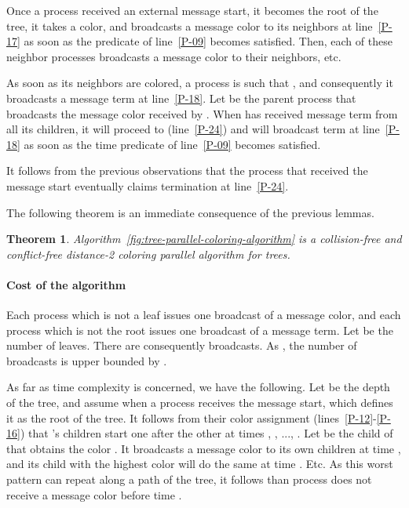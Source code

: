 \documentclass[11pt,english]{article}
\newtheorem{theorem}{Theorem}
\newcommand{\toto}{xxx}
\newenvironment{proofL}{\noindent{\bf
Proof }} {\hspace*{\fill}\par\vspace{3mm}}
\begin{document}
\begin{proofL}
Once a process received an external message {\sc start}, 
it becomes the root of the tree, it takes a color, 
and broadcasts a message {\sc color}
to its neighbors at line~\ref{P-17} as soon as the
predicate of line~\ref{P-09}  becomes satisfied. 
Then, each of these neighbor processes  broadcasts a 
message {\sc color} to their neighbors, etc. 

As soon as its neighbors are  colored, a process  is such 
that , and consequently it broadcasts a message 
{\sc term}  at line~\ref{P-18}. 
Let   be the parent process that  broadcasts the message {\sc color} 
received by . When  has received message {\sc term} 
from all its children, it will proceed to  (line~\ref{P-24}) 
and will broadcast {\sc term}  at line~\ref{P-18} as soon as the 
time predicate of line~\ref{P-09} becomes satisfied. 

It follows from the previous observations that the process that received 
the message {\sc start} eventually claims termination at line~\ref{P-24}. 
\renewcommand{\toto}{lemma:par-termination}
\end{proofL}


\noindent
The following theorem is an immediate consequence of the previous lemmas. 
\begin{theorem}
\label{theo:parallel-coloring}
Algorithm~{\em\ref{fig:tree-parallel-coloring-algorithm}}
is a collision-free and conflict-free distance-2 coloring 
parallel algorithm for trees. 
\end{theorem}

\paragraph{Cost of the algorithm}
Each process which is not a leaf issues one broadcast of a message 
{\sc color}, and each process which is not the root issues one 
broadcast of a message {\sc term}. Let  be the number of leaves.
There are consequently  broadcasts.  As , 
the number of broadcasts is upper bounded by .


As far as time complexity is concerned, we have the following.  Let
 be the depth of the tree, and assume  when a process
 receives the message {\sc start}, which defines it as the 
root of the tree. It follows from their color assignment 
(lines~\ref{P-12}-\ref{P-16}) that 's 
children start one after the other at times , , ..., .
Let  be the child of  that obtains the color .
It broadcasts a message  {\sc color} to its own children at time 
 , and its child with the highest color will 
do the same at time  . Etc. 
As this worst pattern can repeat along a path of the tree, 
it follows than  process does not receive a message {\sc color} 
before time  . 
\end{document}
